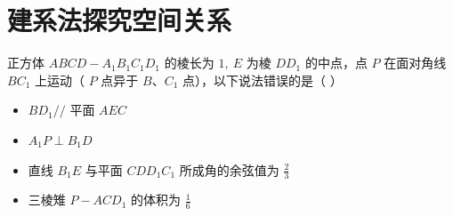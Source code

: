 \section{建系法探究空间关系}







\begin{example}
    正方体 $A B C D-A_1 B_1 C_1 D_1$ 的棱长为 $1, ~ E$ 为棱 $D D_1$ 的中点，点 $P$ 在面对角线 $B C_1$ 上运动（ $P$ 点异于 $B$、$C_1$ 点），以下说法错误的是（ \hspace{2em}）

    \begin{itemize}
        \item $B D_1 / /$ 平面 $A E C$
        \item $A_1 P \perp B_1 D$
        \item 直线 $B_1 E$ 与平面 $C D D_1 C_1$ 所成角的余弦值为 $\frac{2}{3}$
        \item 三棱雉 $P-A C D_1$ 的体积为 $\frac{1}{6}$
    \end{itemize}
\end{example}

